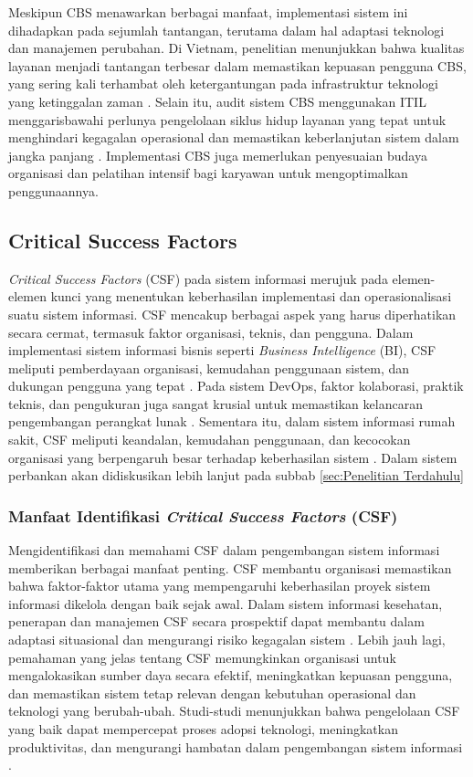 \documentclass[journal,article,submit,pdftex,moreauthors]{Definitions/mdpi}
\begin{document}
Meskipun CBS menawarkan berbagai manfaat, implementasi sistem ini dihadapkan pada sejumlah tantangan, terutama dalam hal adaptasi teknologi dan manajemen perubahan. Di Vietnam, penelitian menunjukkan bahwa kualitas layanan menjadi tantangan terbesar dalam memastikan kepuasan pengguna CBS, yang sering kali terhambat oleh ketergantungan pada infrastruktur teknologi yang ketinggalan zaman \cite{Hsiao-ebanking}. Selain itu, audit sistem CBS menggunakan ITIL menggarisbawahi perlunya pengelolaan siklus hidup layanan yang tepat untuk menghindari kegagalan operasional dan memastikan keberlanjutan sistem dalam jangka panjang \cite{wahyudi-cbs}. Implementasi CBS juga memerlukan penyesuaian budaya organisasi dan pelatihan intensif bagi karyawan untuk mengoptimalkan penggunaannya.

\subsection{Critical Success Factors}
    \textit{Critical Success Factors} (CSF) pada sistem informasi merujuk pada elemen-elemen kunci yang menentukan keberhasilan implementasi dan operasionalisasi suatu sistem informasi. CSF mencakup berbagai aspek yang harus diperhatikan secara cermat, termasuk faktor organisasi, teknis, dan pengguna. Dalam implementasi sistem informasi bisnis seperti \textit{Business Intelligence} (BI), CSF meliputi pemberdayaan organisasi, kemudahan penggunaan sistem, dan dukungan pengguna yang tepat \cite{harfoush2024critical}. Pada sistem DevOps, faktor kolaborasi, praktik teknis, dan pengukuran juga sangat krusial untuk memastikan kelancaran pengembangan perangkat lunak \cite{jayakody2023devops}. Sementara itu, dalam sistem informasi rumah sakit, CSF meliputi keandalan, kemudahan penggunaan, dan kecocokan organisasi yang berpengaruh besar terhadap keberhasilan sistem \cite{arpaci2023hospital}. Dalam sistem perbankan akan didiskusikan lebih lanjut pada subbab \ref{sec:Penelitian Terdahulu} 

\subsubsection{Manfaat Identifikasi \textit{Critical Success Factors} (CSF)}
Mengidentifikasi dan memahami CSF dalam pengembangan sistem informasi memberikan berbagai manfaat penting. CSF membantu organisasi memastikan bahwa faktor-faktor utama yang mempengaruhi keberhasilan proyek sistem informasi dikelola dengan baik sejak awal. Dalam sistem informasi kesehatan, penerapan dan manajemen CSF secara prospektif dapat membantu dalam adaptasi situasional dan mengurangi risiko kegagalan sistem \cite{aggestam2023apply}. Lebih jauh lagi, pemahaman yang jelas tentang CSF memungkinkan organisasi untuk mengalokasikan sumber daya secara efektif, meningkatkan kepuasan pengguna, dan memastikan sistem tetap relevan dengan kebutuhan operasional dan teknologi yang berubah-ubah. Studi-studi menunjukkan bahwa pengelolaan CSF yang baik dapat mempercepat proses adopsi teknologi, meningkatkan produktivitas, dan mengurangi hambatan dalam pengembangan sistem informasi \cite{jayakody2023devops}.
\end{document}
